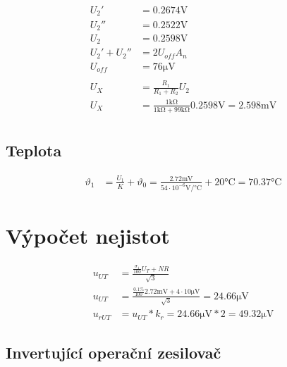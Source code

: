 \documentclass{article}
\begin{document}
$$
\begin{aligned}
	U_2' &= 0.2674 \si{\volt}\\
	U_2'' &= 0.2522 \si{\volt}\\
	U_2 &= 0.2598 \si{\volt}
	\\
	U_2'+U_2'' &= 2U_{off}A_n\\
	U_{off} &= 76 \si{\micro\volt}\\
	\\
	U_X &= \frac{R_1}{R_1+R_2}U_2\\
	U_X &= \frac{1\si{\kilo\ohm}}{1\si{\kilo\ohm} + 99\si{\kilo\ohm}}0.2598 \si{\volt} = 2.598 \si{\milli\volt}\\
\end{aligned}
$$

\subsection{Teplota}

$$
\begin{aligned}
	\vartheta_1&=\frac{U_1}{K}+\vartheta_0=\frac{2.72 \si{\milli\volt}}{54 \cdot 10^{-6} \si{\volt\per\degreeCelsius}}+20 \si{\degreeCelsius} = 70.37 \si{\degreeCelsius}
\end{aligned}
$$

\section{Výpočet nejistot}

$$
\begin{aligned}
	u_{UT}&=\frac{ \frac{\sigma_1}{100}U_T + NR }{\sqrt{3}}\\
	u_{UT}&=\frac{	\frac{0.1\%}{100}2.72 \si{\milli\volt} + 4 \cdot 10 \si{\micro\volt}}{\sqrt{3}} = 24.66 \si{\micro\volt}\\
	u_{rUT} &= u_{UT}*k_r = 24.66 \si{\micro\volt} * 2 = 49.32 \si{\micro\volt}
\end{aligned}
$$

\subsection{Invertující operační zesilovač}
\end{document}
